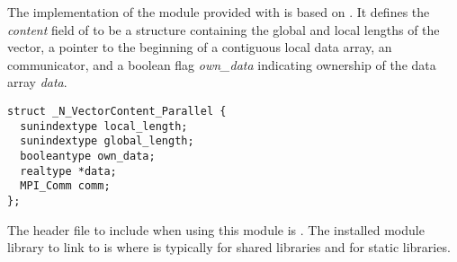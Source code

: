 %
The {\nvecp} implementation of the {\nvector} module provided with
{\sundials} is based on {\mpi}.  It defines the {\em content}
field of  to be a structure containing the global and local lengths 
of the vector, a pointer to the beginning of a contiguous local data array,
an {\mpi} communicator, and a boolean flag {\em own\_data} indicating ownership of 
the data array {\em data}.
\begin{verbatim} 
struct _N_VectorContent_Parallel {
  sunindextype local_length;
  sunindextype global_length;
  booleantype own_data;
  realtype *data;
  MPI_Comm comm;
};
\end{verbatim}

The header file to include when using this module is .
The installed module library to link to is
where  is typically  for shared libraries and 
for static libraries.


